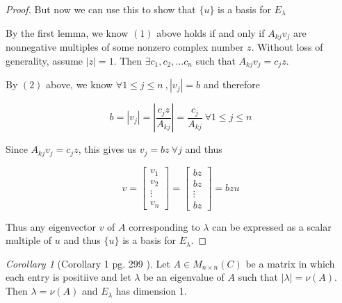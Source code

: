 \documentclass{amsart}
\theoremstyle{definition}
\theoremstyle{remark}
\newtheorem{corollary}{Corollary}[theorem]
\numberwithin{equation}{section}
\begin{document}
\begin{proof}
But now we can use this to show that $\{ u \}$ is a basis for $E_{\lambda}$

By the first lemma, we know $(1)$ above holds if and only if $A_{kj}v_j$ are nonnegative multiples of some nonzero complex number $z$.
Without loss of generality, assume $|z| = 1$.
Then $\exists c_1, c_2, \ldots c_n$ such that $A_{kj}v_j = c_j z$.

By $(2)$ above, we know $\forall  1 \leq j \leq n\ , |v_j| = b$ and therefore

$$b = |v_j| = |\frac{c_jz}{A_{kj}}| = \frac{c_j}{A_{kj}} \ \forall 1 \leq j \leq n$$

Since $A_{kj}v_j = c_j z$, this gives us $v_j = bz\ \forall j$ and thus 


\begin{equation}
    v = \begin{bmatrix}
           v_{1} \\
           v_{2} \\
           \vdots \\
           v_{n}
         \end{bmatrix}
     	= \begin{bmatrix}
           bz \\
           bz \\
           \vdots \\
           bz
         \end{bmatrix}
        = bzu 
\end{equation}

Thus any eigenvector $v$ of $A$ corresponding to $\lambda$ can be expressed as a scalar multiple of $u$ and thus $\{ u \}$ is a basis for $E_{\lambda}$.


\end{proof}

\begin{corollary}[Corollary 1 pg. 299 \cite{friedberg2003linear} ]

	Let $A \in M_{n \times n}(C)$ be a matrix in which each entry is positiive and let $\lambda$ be an eigenvalue of $A$ such that $|\lambda| = \nu(A)$.
	Then  $\lambda = \nu(A)$ and $E_{\lambda}$ has dimension 1. \newline

\end{corollary}
\end{document}

